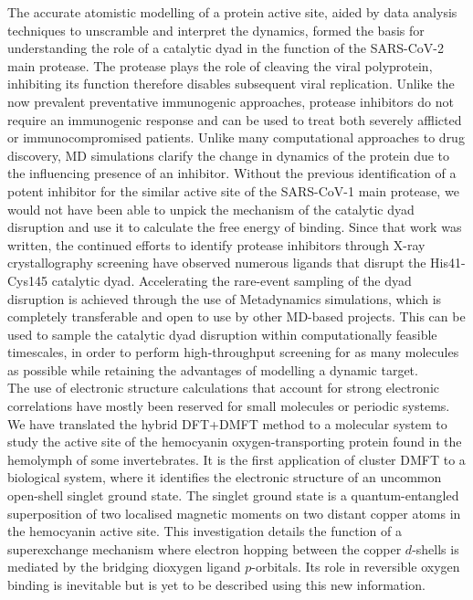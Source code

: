 The accurate atomistic modelling of a protein active site, aided by data analysis techniques to unscramble and interpret the dynamics, formed the basis for understanding the role of a catalytic dyad in the function of the SARS-CoV-2 main protease. The protease plays the role of cleaving the viral polyprotein, inhibiting its function therefore disables subsequent viral replication. Unlike the now prevalent preventative immunogenic approaches, protease inhibitors do not require an immunogenic response and can be used to treat both severely afflicted or immunocompromised patients. Unlike many computational approaches to drug discovery, MD simulations clarify the change in dynamics of the protein due to the influencing presence of an inhibitor. Without the previous identification of a potent inhibitor for the similar active site of the SARS-CoV-1 main protease, we would not have been able to unpick the mechanism of the catalytic dyad disruption and use it to calculate the free energy of binding. Since that work was written, the continued efforts to identify protease inhibitors through X-ray crystallography screening have observed numerous ligands that disrupt the His41-Cys145 catalytic dyad. Accelerating the rare-event sampling of the dyad disruption is achieved through the use of Metadynamics simulations, which is completely transferable and open to use by other MD-based projects. This can be used to sample the catalytic dyad disruption within computationally feasible timescales, in order to perform high-throughput screening for as many molecules as possible while retaining the advantages of modelling a dynamic target. \\

The use of electronic structure calculations that account for strong electronic correlations have mostly been reserved for small molecules or periodic systems. We have translated the hybrid DFT+DMFT method to a molecular system to study the active site of the hemocyanin oxygen-transporting protein found in the hemolymph of some invertebrates. It is the first application of cluster DMFT to a biological system, where it identifies the electronic structure of an uncommon open-shell singlet ground state. The singlet ground state is a quantum-entangled superposition of two localised magnetic moments on two distant copper atoms in the hemocyanin active site. This investigation details the function of a superexchange mechanism where electron hopping between the copper $d$-shells is mediated by the bridging dioxygen ligand $p$-orbitals. Its role in reversible oxygen binding is inevitable but is yet to be described using this new information. \\


